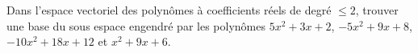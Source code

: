 \begin{exercice}\label{exoLineraire0025}

	Dans l'espace vectoriel des polynômes à coefficients réels de degré $\leq 2$, trouver une base du sous espace engendré par les polynômes $5x^2+3x+2$, $-5x^2+9x+8$, $-10x^2+18x+12$ et $x^2+9x+6$.

\end{exercice}
